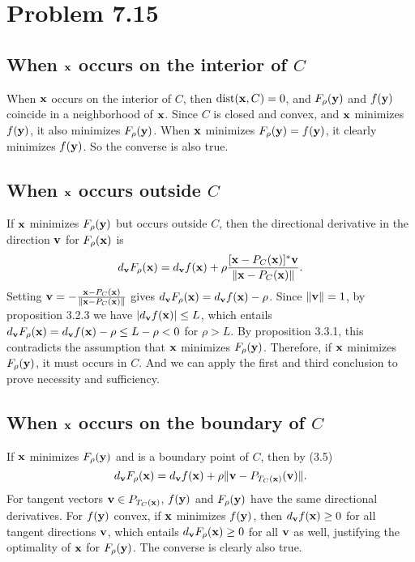 \documentclass{scrartcl}
\begin{document}
\section*{Problem 7.15}

\subsection*{When $\mathbf{x}$ occurs on the interior of $C$} 

When $\mathbf{x}$ occurs on the interior of $C$, then $\text{dist}(\mathbf{x}, C) = 0$, and $F_{\rho}(\mathbf{y})$ and $f(\mathbf{y})$ coincide in a neighborhood of $\mathbf{x}$.
Since $C$ is closed and convex, and $\mathbf{x}$ minimizes $f(\mathbf{y})$, it also minimizes $F_{\rho}(\mathbf{y})$. When $\mathbf{x}$ minimizes $F_{\rho}(\mathbf{y}) = f(\mathbf{y})$,
it clearly minimizes $f(\mathbf{y})$. So the converse is also true.

\subsection*{When $\mathbf{x}$ occurs outside $C$}

If $\mathbf{x}$ minimizes $F_{\rho}(\mathbf{y})$ but occurs outside $C$, then the directional derivative in the direction $\mathbf{v}$ for $F_{\rho}(\mathbf{x})$ is
\begin{equation}
    d_{\mathbf{v}}F_{\rho}(\mathbf{x}) = d_{\mathbf{v}}f(\mathbf{x}) + \rho { {[\mathbf{x}-P_C(\mathbf{x})]^*\mathbf{v}} \over {\|\mathbf{x}-P_C(\mathbf{x})\|} }.
\end{equation}
Setting $\mathbf{v} = -{ {\mathbf{x}-P_C(\mathbf{x})} \over {\|\mathbf{x}-P_C(\mathbf{x})\|} }$ gives $d_{\mathbf{v}}F_{\rho}(\mathbf{x}) = d_{\mathbf{v}}f(\mathbf{x}) - \rho$.
Since $\|\mathbf{v}\| = 1$, by proposition 3.2.3 we have $|d_{\mathbf{v}}f(\mathbf{x})| \le L$, which entails
$d_{\mathbf{v}}F_{\rho}(\mathbf{x}) = d_{\mathbf{v}}f(\mathbf{x}) - \rho \le L - \rho < 0$ for $\rho > L$. By proposition 3.3.1, this contradicts the assumption that $\mathbf{x}$
minimizes $F_{\rho}(\mathbf{y})$. Therefore, if $\mathbf{x}$ minimizes $F_{\rho}(\mathbf{y})$, it must occurs in $C$. And we can apply the first and third conclusion to prove
necessity and sufficiency.

\subsection*{When $\mathbf{x}$ occurs on the boundary of $C$} 

If $\mathbf{x}$ minimizes $F_{\rho}(\mathbf{y})$ and is a boundary point of $C$, then by (3.5)
\begin{equation}
    d_{\mathbf{v}}F_{\rho}(\mathbf{x}) = d_{\mathbf{v}}f(\mathbf{x}) + \rho \| \mathbf{v} - P_{T_C(\mathbf{x})}(\mathbf{v}) \|.
\end{equation}
For tangent vectors $\mathbf{v} \in P_{T_C(\mathbf{x})}$, $f(\mathbf{y})$ and $F_{\rho}(\mathbf{y})$ have the same directional derivatives.
For $f(\mathbf{y})$ convex, if $\mathbf{x}$ minimizes $f(\mathbf{y})$, then $d_{\mathbf{v}}f(\mathbf{x}) \ge 0$ for all tangent directions $\mathbf{v}$, which entails
$d_{\mathbf{v}}F_{\rho}(\mathbf{x}) \ge 0$ for all $\mathbf{v}$ as well, justifying the optimality of $\mathbf{x}$ for $F_{\rho}(\mathbf{y})$. The converse is clearly
also true.
\end{document}
